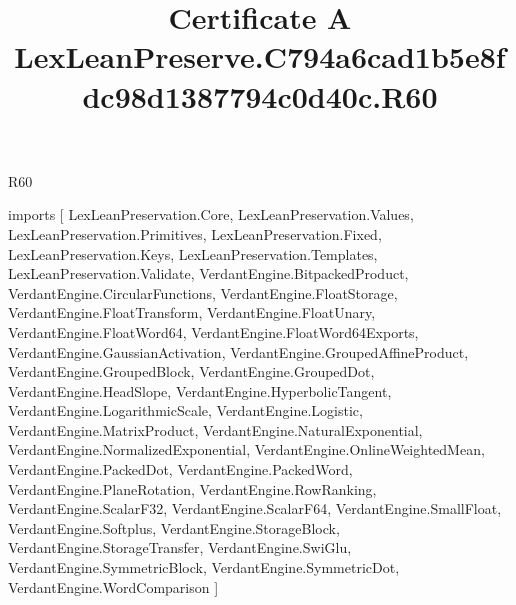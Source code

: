 \begin{lexlean}{R60}
\title{Certificate A LexLeanPreserve.C794a6cad1b5e8fdc98d1387794c0d40c.R60}
\begin{coremodule}
imports [
  LexLeanPreservation.Core,
  LexLeanPreservation.Values,
  LexLeanPreservation.Primitives,
  LexLeanPreservation.Fixed,
  LexLeanPreservation.Keys,
  LexLeanPreservation.Templates,
  LexLeanPreservation.Validate,
  VerdantEngine.BitpackedProduct,
  VerdantEngine.CircularFunctions,
  VerdantEngine.FloatStorage,
  VerdantEngine.FloatTransform,
  VerdantEngine.FloatUnary,
  VerdantEngine.FloatWord64,
  VerdantEngine.FloatWord64Exports,
  VerdantEngine.GaussianActivation,
  VerdantEngine.GroupedAffineProduct,
  VerdantEngine.GroupedBlock,
  VerdantEngine.GroupedDot,
  VerdantEngine.HeadSlope,
  VerdantEngine.HyperbolicTangent,
  VerdantEngine.LogarithmicScale,
  VerdantEngine.Logistic,
  VerdantEngine.MatrixProduct,
  VerdantEngine.NaturalExponential,
  VerdantEngine.NormalizedExponential,
  VerdantEngine.OnlineWeightedMean,
  VerdantEngine.PackedDot,
  VerdantEngine.PackedWord,
  VerdantEngine.PlaneRotation,
  VerdantEngine.RowRanking,
  VerdantEngine.ScalarF32,
  VerdantEngine.ScalarF64,
  VerdantEngine.SmallFloat,
  VerdantEngine.Softplus,
  VerdantEngine.StorageBlock,
  VerdantEngine.StorageTransfer,
  VerdantEngine.SwiGlu,
  VerdantEngine.SymmetricBlock,
  VerdantEngine.SymmetricDot,
  VerdantEngine.WordComparison
]


\end{coremodule}
\end{lexlean}
